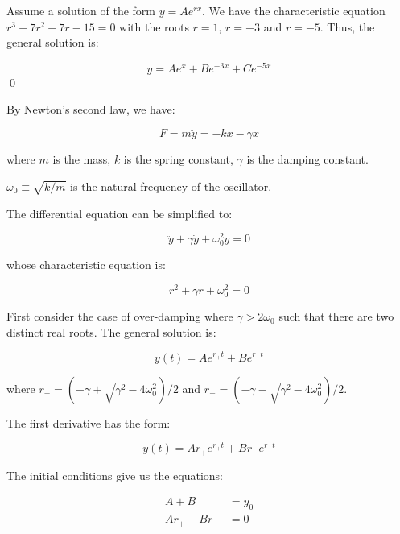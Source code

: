 \documentclass[12pt]{article}
\begin{document}

Assume a solution of the form $y = Ae^{rx}$. We have the characteristic equation $r^{3} + 7r^{2} + 7r - 15 = 0$ with the roots $r = 1$, $r = -3$ and $r = -5$. Thus, the general solution is:

\begin{equation}
    y = Ae^{x} + Be^{-3x} + Ce^{-5x}
\end{equation}
\qed


By Newton's second law, we have:

\begin{equation}
    F = m \ddot{y} = -kx - \gamma \dot{x}
\end{equation}

where $m$ is the mass, $k$ is the spring constant, $\gamma$ is the damping constant.

$\omega_{0} \equiv \sqrt{k/m}$ is the natural frequency of the oscillator.

The differential equation can be simplified to:

\begin{equation}
    \ddot{y} + \gamma \dot{y} + \omega_{0}^{2} y = 0
\end{equation}

whose characteristic equation is:

\begin{equation}
    r^{2} + \gamma r + \omega_{0}^{2} = 0
\end{equation}


First consider the case of over-damping where $\gamma > 2 \omega_{0}$ such that there are two distinct real roots. The general solution is:

\begin{equation}
    y(t) = A e^{r_{+}t} + B e^{r_{-}t}
\end{equation}

where $r_{+} = (-\gamma + \sqrt{\gamma^{2} - 4 \omega_{0}^{2}})/2$ and $r_{-} = (-\gamma - \sqrt{\gamma^{2} - 4 \omega_{0}^{2}})/2$.

The first derivative has the form:

\begin{equation}
    \dot{y}(t) = A r_{+} e^{r_{+}t} + B r_{-} e^{r_{-}t}
\end{equation}

The initial conditions give us the equations:

\begin{equation}
    \begin{split}
        A + B &= y_{0} \\
        A r_{+} + B r_{-} &= 0
    \end{split}
\end{equation}
\end{document}
